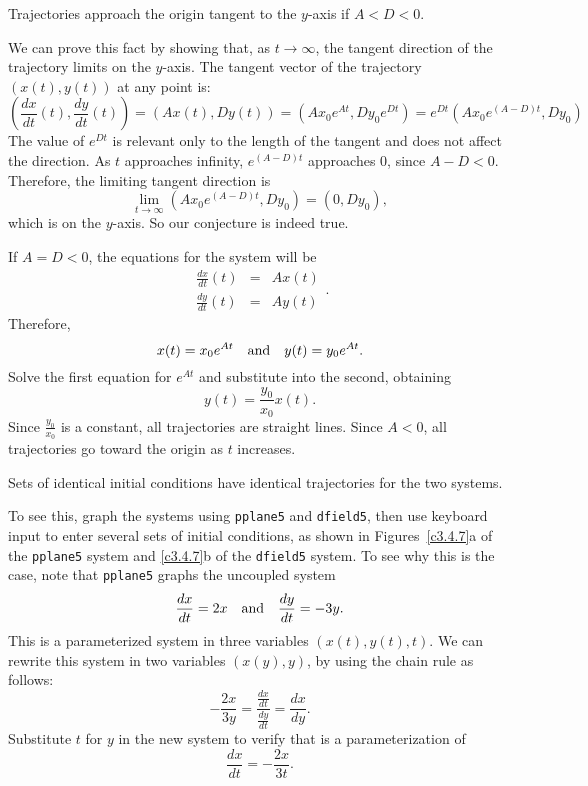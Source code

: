 \ans Trajectories approach the origin tangent to the $y$-axis if
$A < D < 0$. 

\soln We can prove this fact by showing that, as $t \rightarrow \infty$,
the tangent direction of the trajectory limits on the $y$-axis.  The
tangent vector of the trajectory $(x(t),y(t))$ at any point is:
\[ \left(\frac{dx}{dt}(t), \frac{dy}{dt}(t)\right) = \left(Ax(t),
Dy(t)\right) = \left(Ax_0e^{At}, Dy_0e^{Dt}\right) =
e^{Dt}\left(Ax_0e^{(A - D)t}, Dy_0\right) \]
The value of $e^{Dt}$ is relevant only to the length of the
tangent and does not affect the direction.  As $t$ approaches
infinity, $e^{(A - D)t}$ approaches $0$, since $A - D < 0$.
Therefore, the limiting tangent direction is
\[ \lim_{t \rightarrow \infty} \left(Ax_0e^{(A - D)t}, Dy_0\right)
= (0, Dy_0), \]
which is on the $y$-axis.  So our conjecture is indeed true.

If $A = D < 0$, the equations for the system will be
\[ \begin{array}{rcl}
\frac{dx}{dt}(t) & = & Ax(t) \\
\frac{dy}{dt}(t) & = & Ay(t)\end{array}. \]
Therefore,
\[ x(t) = x_0e^{At} \quad\mbox{and}\quad y(t) = y_0e^{At}. \]
Solve the first equation for $e^{At}$ and substitute into the
second, obtaining \[ y(t) = \frac{y_0}{x_0}x(t). \]
Since $\frac{y_0}{x_0}$ is a constant, all trajectories are
straight lines.  Since $A < 0$, all trajectories go toward the
origin as $t$ increases.

\ans Sets of identical initial conditions have identical trajectories
for the two systems. 

\soln To see this, graph the systems using {\tt pplane5} and
{\tt dfield5}, then use keyboard input to enter several sets of initial
conditions, as shown in Figures~\ref{c3.4.7}a of the {\tt pplane5} system
and \ref{c3.4.7}b of the {\tt dfield5} system.  To see why this is the case,
note that {\tt pplane5} graphs the uncoupled system
\begin{equation} \label{eq:3.4.7}
\frac{dx}{dt} = 2x \quad\mbox{and}\quad \frac{dy}{dt} = -3y.
\end{equation}
This is a parameterized system in three variables $(x(t),y(t),t)$.
We can rewrite this system in two variables $(x(y),y)$, by using the
chain rule as follows:
\[ -\frac{2x}{3y} = \frac{\frac{dx}{dt}}{\frac{dy}{dt}} = \frac{dx}{dy}. \]
Substitute $t$ for $y$ in the new system to verify that 
is a parameterization of
\[ \frac{dx}{dt} = -\frac{2x}{3t}. \]

